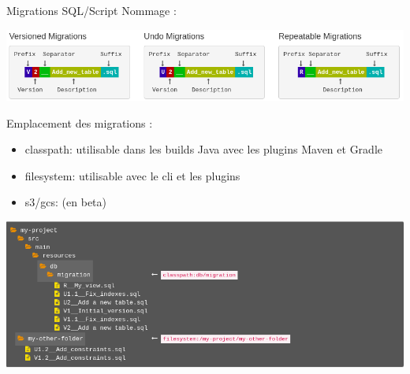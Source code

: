 \documentclass[slidestop,compress,11pt,xcolor=dvipsnames,french]{beamer}
\begin{document}
\begin{frame}{Migrations SQL/Script}
Nommage :
\begin{center}
 \includegraphics[scale=0.3]{nommage_sql.png}
\end{center}

Emplacement des migrations :
\begin{itemize}
 \item classpath: utilisable dans les builds Java avec les plugins Maven et Gradle
 \item filesystem: utilisable avec le cli et les plugins
 \item s3/gcs: (en beta)
\end{itemize}

\begin{center}
 \includegraphics[scale=0.2,keepaspectratio=true]{locations_sql.png}
\end{center}
\end{frame}
\end{document}
